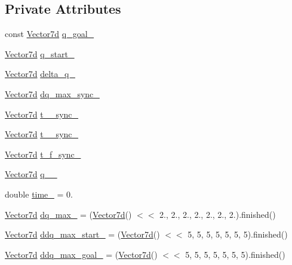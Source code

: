 \subsection*{Private Attributes}
\begin{DoxyCompactItemize}
\item 
const \hyperlink{classMotionGenerator_a499bd17d3a5c7583b4c06923f532185d}{Vector7d} \hyperlink{classMotionGenerator_a181e3ac9ca9d23a813e06a69e4583ec7}{q\+\_\+goal\+\_\+}
\item 
\hyperlink{classMotionGenerator_a499bd17d3a5c7583b4c06923f532185d}{Vector7d} \hyperlink{classMotionGenerator_a11a7cfc3fa6c19202c7dcc2f5282046e}{q\+\_\+start\+\_\+}
\item 
\hyperlink{classMotionGenerator_a499bd17d3a5c7583b4c06923f532185d}{Vector7d} \hyperlink{classMotionGenerator_a943798bdc9c985f66548c59d562fd8b7}{delta\+\_\+q\+\_\+}
\item 
\hyperlink{classMotionGenerator_a499bd17d3a5c7583b4c06923f532185d}{Vector7d} \hyperlink{classMotionGenerator_a4924578b9275d362c015b16f80232263}{dq\+\_\+max\+\_\+sync\+\_\+}
\item 
\hyperlink{classMotionGenerator_a499bd17d3a5c7583b4c06923f532185d}{Vector7d} \hyperlink{classMotionGenerator_a0b580a9e6904d925146081c870f76266}{t\+\_\+\_\+sync\+\_\+}
\item 
\hyperlink{classMotionGenerator_a499bd17d3a5c7583b4c06923f532185d}{Vector7d} \hyperlink{classMotionGenerator_a5b25974dfd22aefacc286a01211ff93d}{t\+\_\+\_\+sync\+\_\+}
\item 
\hyperlink{classMotionGenerator_a499bd17d3a5c7583b4c06923f532185d}{Vector7d} \hyperlink{classMotionGenerator_a7119bd48c0d8b0f838a3a81e8f52a8b2}{t\+\_\+f\+\_\+sync\+\_\+}
\item 
\hyperlink{classMotionGenerator_a499bd17d3a5c7583b4c06923f532185d}{Vector7d} \hyperlink{classMotionGenerator_a9e8620af632e541116e9b5e219f1ccbd}{q\+\_\+\_\+}
\item 
double \hyperlink{classMotionGenerator_a42b90532e4f257bb592b3c2a8e8e370f}{time\+\_\+} = 0.
\item 
\hyperlink{classMotionGenerator_a499bd17d3a5c7583b4c06923f532185d}{Vector7d} \hyperlink{classMotionGenerator_af7cb3714dc8d242ac0a827838c4a977d}{dq\+\_\+max\+\_\+} = (\hyperlink{classMotionGenerator_a499bd17d3a5c7583b4c06923f532185d}{Vector7d}() $<$$<$ 2., 2., 2., 2., 2., 2., 2.).finished()
\item 
\hyperlink{classMotionGenerator_a499bd17d3a5c7583b4c06923f532185d}{Vector7d} \hyperlink{classMotionGenerator_aba35338c7023ab218a3c2991a36a79d4}{ddq\+\_\+max\+\_\+start\+\_\+} = (\hyperlink{classMotionGenerator_a499bd17d3a5c7583b4c06923f532185d}{Vector7d}() $<$$<$ 5, 5, 5, 5, 5, 5, 5).finished()
\item 
\hyperlink{classMotionGenerator_a499bd17d3a5c7583b4c06923f532185d}{Vector7d} \hyperlink{classMotionGenerator_afa25b16e5c66c9f23c9869fa992b0bd4}{ddq\+\_\+max\+\_\+goal\+\_\+} = (\hyperlink{classMotionGenerator_a499bd17d3a5c7583b4c06923f532185d}{Vector7d}() $<$$<$ 5, 5, 5, 5, 5, 5, 5).finished()
\end{DoxyCompactItemize}
